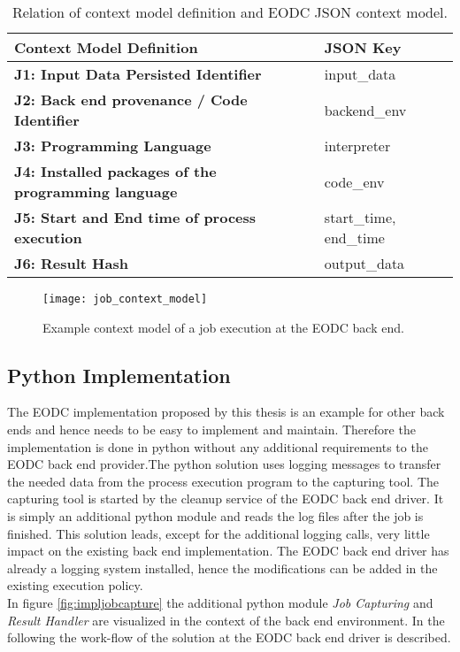 \documentclass[draft,final]{vutinfth} %
\begin{document}
\begin{table}[]
	\caption{Relation of context model definition and EODC JSON context model.}
	\begin{tabular}{l|l}
		\textbf{Context Model Definition} & \textbf{JSON Key} \\ \hline
		\textbf{J1: Input Data Persisted Identifier} & input\_data \\ \hline
		\textbf{J2: Back end provenance / Code Identifier} & backend\_env \\ \hline
		\textbf{J3: Programming Language} & interpreter \\ \hline
		\textbf{J4: Installed packages of the programming language} & code\_env \\ \hline
		\textbf{J5: Start and End time of process execution} & start\_time, end\_time \\ \hline
		\textbf{J6: Result Hash} & output\_data \\ %
	\end{tabular}
\label{Tab:contextmodel}
\end{table}

\begin{figure}[h]
	\centering
	\texttt{[image: job\_context\_model]}
	\caption{Example context model of a job execution at the EODC back end.}
	\label{fig:job_context_model} %
\end{figure}

\subsection{Python Implementation}\label{Implementation:Python Implementation}
The EODC implementation proposed by this thesis is an example for other back ends and hence needs to be easy to implement and maintain. Therefore the implementation is done in python without any additional requirements to the EODC back end provider.The python solution uses logging messages to transfer the needed data from the process execution program to the capturing tool. The capturing tool is started by the cleanup service of the EODC back end driver. It is simply an additional python module and reads the log files after the job is finished. This solution leads, except for the additional logging calls, very little impact on the existing back end implementation. The EODC back end driver has already a logging system installed, hence the modifications can be added in the existing execution policy. \\
In figure \ref{fig:impljobcapture} the additional python module \textit{Job Capturing} and \textit{Result Handler} are visualized in the context of the back end environment. In the following the work-flow of the solution at the EODC back end driver is described. 
\end{document}
